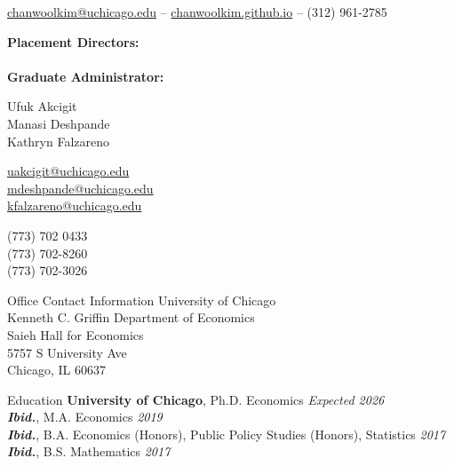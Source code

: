 \documentclass{resume} %
\begin{document}
	\vspace{-8mm}
	\begin{center}
	\href{mailto:chanwoolkim@uchicago.edu}{chanwoolkim@uchicago.edu} -- \href{chanwoolkim.github.io}{chanwoolkim.github.io} -- (312) 961-2785
	\end{center}
	\vspace{2mm}
	\begin{minipage}[t]{0.32\textwidth}
		\textbf{Placement Directors:} \\
		\\
		\textbf{Graduate Administrator:} \\
	\end{minipage}
	\begin{minipage}[t]{0.23\textwidth}
		Ufuk Akcigit \\
		Manasi Deshpande \\
		Kathryn Falzareno \\
	\end{minipage}
	\begin{minipage}[t]{0.29\textwidth}
		\href{mailto:uakcigit@uchicago.edu}{uakcigit@uchicago.edu} \\
		\href{mailto:mdeshpande@uchicago.edu}{mdeshpande@uchicago.edu} \\
		\href{mailto:kfalzareno@uchicago.edu}{kfalzareno@uchicago.edu} \\
	\end{minipage}
	\begin{minipage}[t]{0.15\textwidth}
		(773) 702 0433 \\
		(773) 702-8260 \\
		(773) 702-3026 \\
	\end{minipage}
	
	\begin{rSection}{Office Contact Information}
		University of Chicago \\
		Kenneth C. Griffin Department of Economics \\
		Saieh Hall for Economics \\
		5757 S University Ave \\
		Chicago, IL 60637
	\end{rSection}
	
	\begin{rSection}{Education}
		\textbf{University of Chicago}, Ph.D. Economics \hfill {\em Expected 2026} \\
		\textbf{\textit{Ibid.}}, M.A. Economics \hfill {\em 2019} \\
		\textbf{\textit{Ibid.}}, B.A. Economics (Honors), Public Policy Studies (Honors), Statistics \hfill {\em 2017} \\
		\textbf{\textit{Ibid.}}, B.S. Mathematics \hfill {\em 2017}
	\end{rSection}
	
\end{document}

